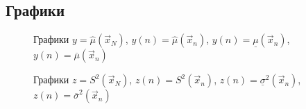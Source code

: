 \newpage

\subsection{Графики}

\begin{figure}[h!]
 \caption{Графики $y = \hat\mu(\vec x_N)$, $y(n) = \hat\mu(\vec x_n)$, $y(n) = \underline\mu(\vec x_n)$, $y(n) = \overline\mu(\vec x_n)$}
\end{figure}

\begin{figure}[!h]
 \caption{Графики $z = S^2(\vec x_N)$, $z(n) = S^2(\vec x_n)$, $z(n) = \underline \sigma^2(\vec x_n)$, $z(n) = \overline \sigma^2(\vec x_n)$}
\end{figure}

\newpage